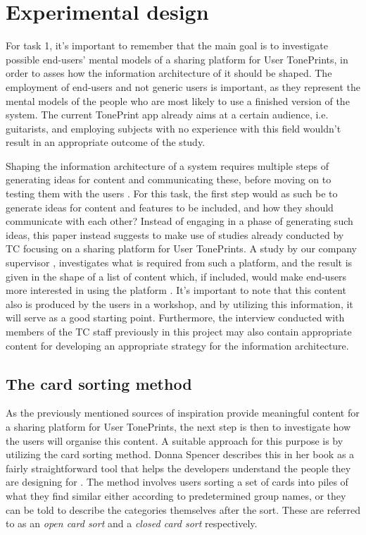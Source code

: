 
\section{Experimental design}
\label{ExperimentalDesign}
For task 1, it's important to remember that the main goal is to investigate possible end-users' mental models of a sharing platform for User TonePrints, in order to asses how the information architecture of it should be shaped. The employment of end-users and not generic users is important, as they represent the mental models of the people who are most likely to use a finished version of the system. The current TonePrint app already aims at a certain audience, i.e. guitarists, and employing subjects with no experience with this field wouldn't result in an appropriate outcome of the study.

Shaping the information architecture of a system requires multiple steps of generating ideas for content and communicating these, before moving on to testing them with the users \parencite[][356-364]{PDF:InformationArchitecture}. For this task, the first step would as such be to generate ideas for content and features to be included, and how they should communicate with each other? Instead of engaging in a phase of generating such ideas, this paper instead suggests to make use of studies already conducted by TC focusing on a sharing platform for User TonePrints. A study by our company supervisor \textcite{PDF:BrugerWorkshopUserTonePrints}, investigates what is required from such a platform, and the result is given in the shape of a list of content which, if included, would make end-users more interested in using the platform \parencite[][35]{PDF:BrugerWorkshopUserTonePrints}. It's important to note that this content also is produced by the users in a workshop, and by utilizing this information, it will serve as a good starting point. Furthermore, the interview conducted with members of the TC staff previously in this project may also contain appropriate content for developing an appropriate strategy for the information architecture.

\subsection{The card sorting method}
\label{CardSort}
As the previously mentioned sources of inspiration provide meaningful content for a sharing platform for User TonePrints, the next step is then to investigate how the users will organise this content. A suitable approach for this purpose is by utilizing the card sorting method. Donna Spencer describes this in her book as a fairly straightforward tool that helps the developers understand the people they are designing for \parencite[][6]{WEB:DonnaSpencer}. The method involves users sorting a set of cards into piles of what they find similar either according to predetermined group names, or they can be told to describe the categories themselves after the sort. These are referred to as an \textit{open card sort} and a \textit{closed card sort} respectively.

